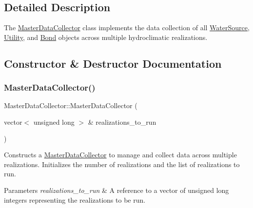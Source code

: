 \subsection{Detailed Description}
The {\ttfamily \mbox{\hyperlink{classMasterDataCollector}{Master\+Data\+Collector}}} class implements the data collection of all \mbox{\hyperlink{classWaterSource}{Water\+Source}}, \mbox{\hyperlink{classUtility}{Utility}}, and \mbox{\hyperlink{classBond}{Bond}} objects across multiple hydroclimatic realizations. 

\subsection{Constructor \& Destructor Documentation}
\mbox{\label{classMasterDataCollector_acb6f64c053bda26e5cf7e4ec8dacd0cd}} 
\subsubsection{\texorpdfstring{Master\+Data\+Collector()}{MasterDataCollector()}}
{\footnotesize\ttfamily Master\+Data\+Collector\+::\+Master\+Data\+Collector (\begin{DoxyParamCaption}\item[{vector$<$ unsigned long $>$ \&}]{realizations\+\_\+to\+\_\+run }\end{DoxyParamCaption})}



Constructs a \mbox{\hyperlink{classMasterDataCollector}{Master\+Data\+Collector}} to manage and collect data across multiple realizations. Initializes the number of realizations and the list of realizations to run. 


\begin{DoxyParams}{Parameters}
{\em realizations\+\_\+to\+\_\+run} & A reference to a vector of unsigned long integers representing the realizations to be run. \\
\hline
\end{DoxyParams}
\mbox{\label{classMasterDataCollector_aedeef15ddcd660886261d8759db37029}} 
